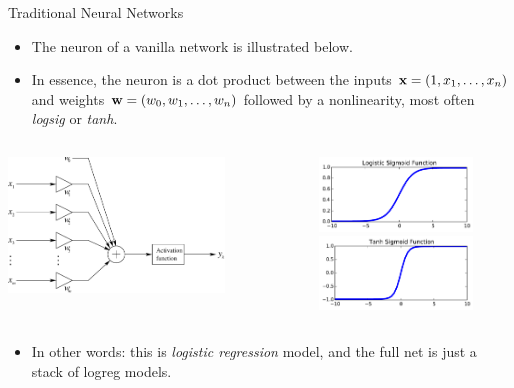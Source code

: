 \documentclass[10pt, aspectratio=169]{beamer} %
\newcommand{\w}{{\bf w}}
\newcommand{\x}{{\bf x}}
\begin{document}
\begin{frame}{Traditional Neural Networks}
	
	\begin{itemize}
		\item The neuron of a vanilla network is illustrated below.
		\item In essence, the neuron is a dot product between the inputs $\x = (1, x_1, \ldots, x_n)$ and weights
		$\w = (w_0, w_1, \ldots, w_n)$ followed by a nonlinearity, most often \emph{logsig} or \emph{tanh}.
	\end{itemize}
	\centering
	\begin{columns}[onlytextwidth]
	\centerline{\includegraphics[width=0.75\textwidth]{Neuron.pdf}}
	\includegraphics[width=0.8\textwidth]{sigmoid.pdf}\\
  \includegraphics[width=0.8\textwidth]{sigmoid_tanh.pdf}
	\end{columns}
\begin{itemize}
	\item In other words: this is \emph{logistic regression} model, and 
	the full net is just a stack of logreg models.
\end{itemize}
\end{frame}
\end{document}
